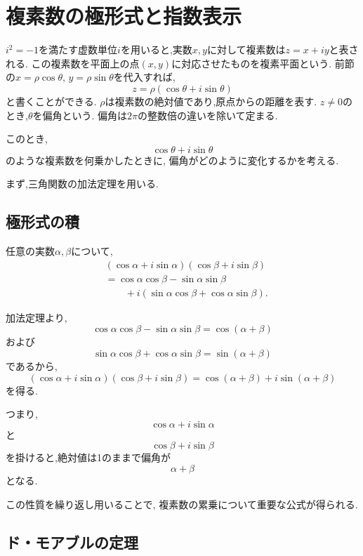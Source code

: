 
\section{複素数の極形式と指数表示}

$i^2=-1$を満たす虚数単位$i$を用いると,実数$x,y$に対して複素数は$z=x+iy$と表される.
この複素数を平面上の点$(x,y)$に対応させたものを複素平面という.
前節の$x=\rho\cos\theta,\,y=\rho\sin\theta$を代入すれば,
\[
  z
  =
  \rho(
    \cos\theta+i\sin\theta
  )
\]
と書くことができる. $\rho$は複素数の絶対値であり,原点からの距離を表す.
$z\ne0$のとき,$\theta$を偏角という. 偏角は$2\pi$の整数倍の違いを除いて定まる.

このとき,
\[
  \cos\theta+i\sin\theta
\]
のような複素数を何乗かしたときに,
偏角がどのように変化するかを考える.

まず,三角関数の加法定理を用いる.


\subsection{極形式の積}

  任意の実数$\alpha,\beta$について,
  \begin{align*}
    &(\cos\alpha+i\sin\alpha)
    (\cos\beta+i\sin\beta)\\
    &=
    \cos\alpha\cos\beta
    -\sin\alpha\sin\beta\\
    &\qquad
    +i(
      \sin\alpha\cos\beta
      +\cos\alpha\sin\beta
    ).
  \end{align*}

  加法定理より,
  \[
    \cos\alpha\cos\beta
    -\sin\alpha\sin\beta
    =
    \cos(\alpha+\beta)
  \]
  および
  \[
    \sin\alpha\cos\beta
    +\cos\alpha\sin\beta
    =
    \sin(\alpha+\beta)
  \]
  であるから,
  \[
    (\cos\alpha+i\sin\alpha)
    (\cos\beta+i\sin\beta)
    =
    \cos(\alpha+\beta)
    +i\sin(\alpha+\beta)
  \]
  を得る.

  つまり,
  \[
    \cos\alpha+i\sin\alpha
  \]
  と
  \[
    \cos\beta+i\sin\beta
  \]
  を掛けると,絶対値は1のままで偏角が
  \[
    \alpha+\beta
  \]
  となる.

  この性質を繰り返し用いることで,
  複素数の累乗について重要な公式が得られる.


\subsection{ド・モアブルの定理}

